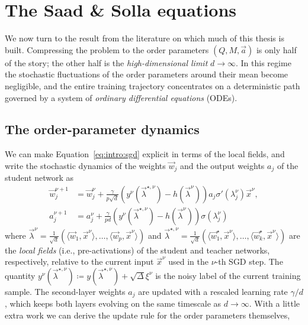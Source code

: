 \section{The Saad \& Solla equations}
We now turn to the result from the literature on which much of this thesis is built.
Compressing the problem to the order parameters $(Q, M, \vec{a})$ is only half of the
story; the other half is the \emph{high-dimensional limit} $d \to \infty$. In this
regime the stochastic fluctuations of the order parameters around their mean become
negligible, and the entire training trajectory concentrates on a deterministic path
governed by a system of \emph{ordinary differential equations} (ODEs).

\subsection{The order-parameter dynamics}
We can make Equation~\eqref{eq:intro:sgd} explicit in terms of the local fields, and write the stochastic dynamics of the weights $\vec{w}_j$ and the output weights $a_j$ of the student network as
\begin{align}
    \vec{w}_j^{\nu+1} &= \vec{w}_j^{\nu} + \frac{\gamma}{p\sqrt{d}} \left( y^\nu(\vec{\lambda}^{\star,\nu}) - h(\vec{\lambda}^{\nu}) \right) a_j \sigma'(\lambda^\nu_j) \vec{x}^\nu, \\
    a_j^{\nu+1} &= a_j^{\nu} + \frac{\gamma}{pd} \left( y^\nu(\vec{\lambda}^{\star,\nu}) - h(\vec{\lambda}^{\nu}) \right) \sigma(\lambda^\nu_j)
\end{align}
where \(\vec{\lambda}^{\nu} = \frac{1}{\sqrt{d}}(\langle \vec{w}_1, \vec{x}^\nu \rangle, \ldots, \langle \vec{w}_p, \vec{x}^\nu \rangle)\) and \(\vec{\lambda}^{\star,\nu} = \frac{1}{\sqrt{d}}(\langle \vec{w}_1^\star, \vec{x}^\nu \rangle, \ldots, \langle \vec{w}_k^\star, \vec{x}^\nu \rangle)\) are the \emph{local fields} (i.e., pre-activations) of the student and teacher networks, respectively, relative to the current input $\vec{x}^\nu$ used in the $\nu$-th SGD step. The quantity \(y^\nu(\vec{\lambda}^{\star,\nu}) \coloneqq y(\vec{\lambda}^{\star,\nu}) + \sqrt{\Delta}\xi^\nu\) is the noisy label of the current training sample.
The second-layer weights $a_j$ are updated with a rescaled learning rate $\gamma/d$, which keeps both layers evolving on the same timescale as $d \to \infty$.
With a little extra work we can derive the update rule for the order parameters themselves,
